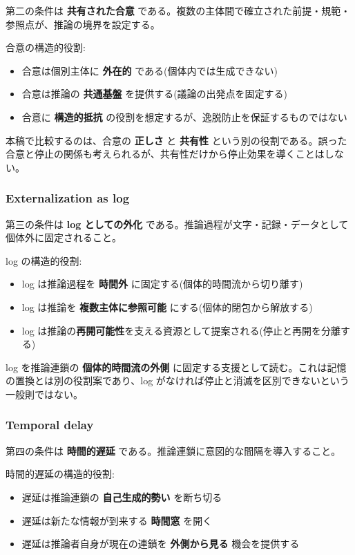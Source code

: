 第二の条件は \textbf{共有された合意} である。複数の主体間で確立された前提・規範・参照点が、推論の境界を設定する。

合意の構造的役割:

\begin{itemize}
\item 合意は個別主体に \textbf{外在的} である(個体内では生成できない)
\item 合意は推論の \textbf{共通基盤} を提供する(議論の出発点を固定する)
\item 合意に \textbf{構造的抵抗} の役割を想定するが、逸脱防止を保証するものではない
\end{itemize}

本稿で比較するのは、合意の \textbf{正しさ} と \textbf{共有性} という別の役割である。誤った合意と停止の関係も考えられるが、共有性だけから停止効果を導くことはしない。

\subsubsection{Externalization as log}


第三の条件は \textbf{log としての外化} である。推論過程が文字・記録・データとして個体外に固定されること。

log の構造的役割:

\begin{itemize}
\item log は推論過程を \textbf{時間外} に固定する(個体的時間流から切り離す)
\item log は推論を \textbf{複数主体に参照可能} にする(個体的閉包から解放する)
\item log は推論の\textbf{再開可能性}を支える資源として提案される(停止と再開を分離する)
\end{itemize}

log を推論連鎖の \textbf{個体的時間流の外側} に固定する支援として読む。これは記憶の置換とは別の役割案であり、log がなければ停止と消滅を区別できないという一般則ではない。

\subsubsection{Temporal delay}


第四の条件は \textbf{時間的遅延} である。推論連鎖に意図的な間隔を導入すること。

時間的遅延の構造的役割:

\begin{itemize}
\item 遅延は推論連鎖の \textbf{自己生成的勢い} を断ち切る
\item 遅延は新たな情報が到来する \textbf{時間窓} を開く
\item 遅延は推論者自身が現在の連鎖を \textbf{外側から見る} 機会を提供する
\end{itemize}

